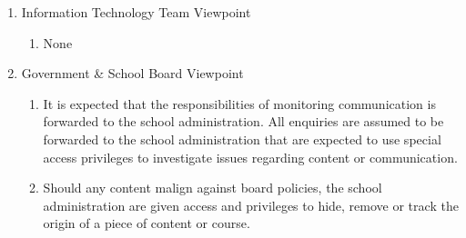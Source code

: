 \documentclass[]{article}
\begin{document}
\begin{enumerate}[{BE}1.]
\begin{enumerate}[{VP1}.1]
\begin{enumerate}
			\end{enumerate}
		\item Information Technology Team Viewpoint
			\begin{enumerate}
				\item None
			\end{enumerate}
		\item Government \& School Board Viewpoint
			\begin{enumerate}
				\item It is expected that the responsibilities of monitoring communication is forwarded to the school administration. All enquiries are assumed to be forwarded to the school administration that are expected to use special access privileges to investigate issues regarding content or communication.
				\item Should any content malign against board policies, the school administration are given access and privileges to hide, remove or track the origin of a piece of content or course.
			\end{enumerate}
	\end{enumerate}


\end{enumerate}
\end{document}
